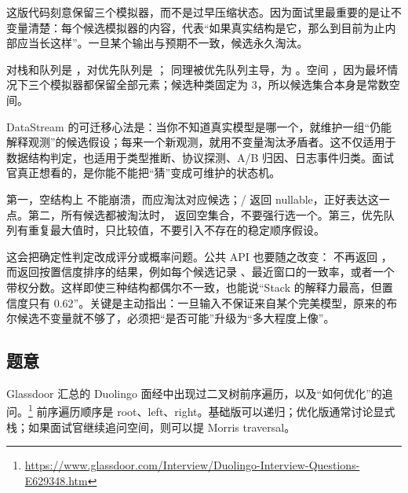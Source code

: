 这版代码刻意保留三个模拟器，而不是过早压缩状态。因为面试里最重要的是让不变量清楚：每个候选模拟器的内容，代表“如果真实结构是它，那么到目前为止内部应当长这样”。一旦某个输出与预期不一致，候选永久淘汰。

\begin{keypoint}[复杂度]
 对栈和队列是 ，对优先队列是 ； 同理被优先队列主导，为 。空间 ，因为最坏情况下三个模拟器都保留全部元素；候选种类固定为 3，所以候选集合本身是常数空间。
\end{keypoint}

\begin{idea}[用不变量筛选候选假设]
DataStream 的可迁移心法是：当你不知道真实模型是哪一个，就维护一组“仍能解释观测”的候选假设；每来一个新观测，就用不变量淘汰矛盾者。这不仅适用于数据结构判定，也适用于类型推断、协议探测、A/B 归因、日志事件归类。面试官真正想看的，是你能不能把“猜”变成可维护的状态机。
\end{idea}

\begin{pitfall}[三个边界最容易漏]
第一，空结构上  不能崩溃，而应淘汰对应候选；/ 返回 nullable，正好表达这一点。第二，所有候选都被淘汰时， 返回空集合，不要强行选一个。第三，优先队列有重复最大值时，只比较值，不要引入不存在的稳定顺序假设。
\end{pitfall}

\begin{followup}
这会把确定性判定改成评分或概率问题。公共 API 也要随之改变： 不再返回 ，而返回按置信度排序的结果，例如每个候选记录 、最近窗口的一致率，或者一个带权分数。这样即使三种结构都偶尔不一致，也能说“Stack 的解释力最高，但置信度只有 0.62”。关键是主动指出：一旦输入不保证来自某个完美模型，原来的布尔候选不变量就不够了，必须把“是否可能”升级为“多大程度上像”。
\end{followup}


\subsection*{题意}

Glassdoor 汇总的 Duolingo 面经中出现过二叉树前序遍历，以及“如何优化”的追问。\srccommunity\footnote{\url{https://www.glassdoor.com/Interview/Duolingo-Interview-Questions-E629348.htm}} 前序遍历顺序是 root、left、right。基础版可以递归；优化版通常讨论显式栈；如果面试官继续追问空间，则可以提 Morris traversal。

